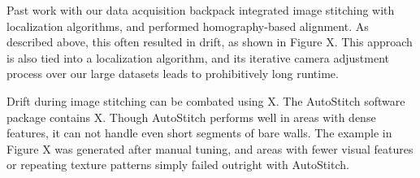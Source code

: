 \documentclass[]{spie}  %
\begin{document}
Past work with our data acquisition backpack integrated image
stitching with localization algorithms, and performed homography-based
alignment. As described above, this often resulted in drift, as shown in Figure X. This approach is also tied into a localization
algorithm, and its iterative camera adjustment process over our large
datasets leads to prohibitively long runtime.

Drift during image stitching can be combated using X. The AutoStitch software package
contains X. Though AutoStitch performs well in areas with dense
features, it can not handle even short segments of bare walls. The example in Figure X was generated after manual tuning, and areas with fewer visual
features or repeating texture patterns simply failed outright with AutoStitch.




\end{document}

